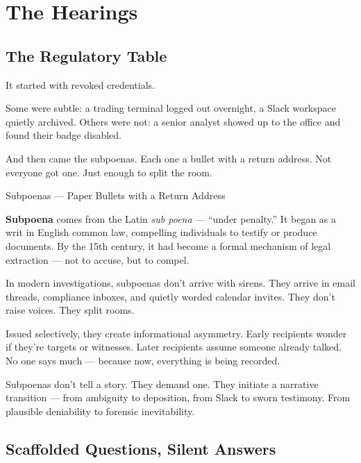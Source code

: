 \section{The Hearings}


\subsection{The Regulatory Table}

It started with revoked credentials.

Some were subtle: a trading terminal logged out overnight, a Slack workspace quietly archived.
Others were not: a senior analyst showed up to the office and found their badge disabled.

And then came the subpoenas.
Each one a bullet with a return address.
Not everyone got one.
Just enough to split the room.

\medskip

\begin{HistoricalSidebar}{Subpoenas --- Paper Bullets with a Return Address}

  \textbf{Subpoena} comes from the Latin \textit{sub poena} — ``under penalty.'' It began as a writ in English 
  common law, compelling individuals to testify or produce documents. By the 15th century, it had become a 
  formal mechanism of legal extraction — not to accuse, but to compel.

  \medskip

  In modern investigations, subpoenas don’t arrive with sirens. They arrive in email threads, compliance inboxes, 
  and quietly worded calendar invites. They don’t raise voices. They split rooms.

  \medskip

  Issued selectively, they create informational asymmetry. Early recipients wonder if they’re targets or witnesses. 
  Later recipients assume someone already talked. No one says much — because now, everything is being recorded.

  \medskip

  Subpoenas don’t tell a story. They demand one. They initiate a narrative transition — from ambiguity to deposition, 
  from Slack to sworn testimony. From plausible deniability to forensic inevitability.
  
\end{HistoricalSidebar}

\medskip

\subsection{Scaffolded Questions, Silent Answers}

